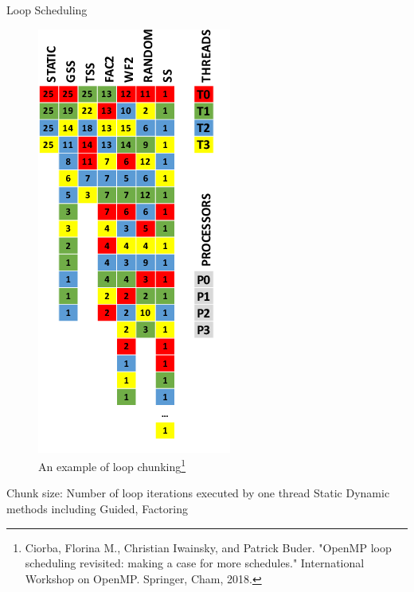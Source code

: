 \documentclass[10pt]{beamer}
\begin{document}
\begin{frame}{Loop Scheduling}
	\begin{outline}
			\begin{figure}[]
			\centering
			\includegraphics[scale=0.5]{images/loop_cropped.png}
			\caption{An example of loop chunking\footnote{Ciorba, Florina M., Christian Iwainsky, and Patrick Buder. "OpenMP loop scheduling revisited: making a case for more schedules." International Workshop on OpenMP. Springer, Cham, 2018.}}	
			\label{fig_loop}
		\end{figure}
		Chunk size: Number of loop iterations executed by one thread 
		\1Static
		\1Dynamic methods including Guided, Factoring
	\end{outline}
\end{frame}

%		
\end{document}
